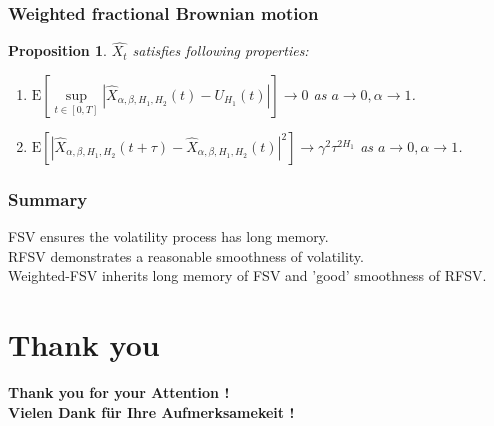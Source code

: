 \documentclass[]{beamer}
\newcommand{\brkt}[1]{\left({#1} \right)}
\newtheorem{proposition}{Proposition}
\begin{document}
\begin{frame}
  \frametitle{Weighted fractional Brownian motion}
  \begin{proposition}
	$\hat{X_t}$ satisfies following properties:
\begin{enumerate}[topsep=0pt, itemsep=-1ex, partopsep=1ex, parsep=1ex, label=(\roman*)]	
  \item $\mathrm{E}[\sup\limits_{t\in[0,T]}|\hat{X}_{\alpha,\beta,H_1,H_2}(t) - U_{H_1}(t)|] \rightarrow 0$
	as $a\rightarrow 0, \alpha\rightarrow 1$.
  \item $\mathrm{E}[|\hat{X}_{\alpha,\beta,H_1,H_2}(t+\tau) - \hat{X}_{\alpha,\beta,H_1,H_2}(t)|^2] \rightarrow  \gamma^2 \tau^{2H_1}$
	as $a\rightarrow 0, \alpha\rightarrow 1$.
  \end{enumerate}
  \end{proposition}
\end{frame}

\begin{frame}
  \frametitle{Summary}
  FSV ensures the volatility process has long memory.\\
  \bigskip
  RFSV demonstrates a reasonable smoothness of volatility.\\
  \bigskip
  Weighted-FSV inherits long memory of FSV and 'good' smoothness of RFSV.
\end{frame}

\section{Thank you}
\begin{frame}
  \begin{center}
	\bf{Thank you for your Attention !} \\
	\bf{Vielen Dank für Ihre Aufmerksamekeit !}
  \end{center}
  \end{frame}
\end{document}
